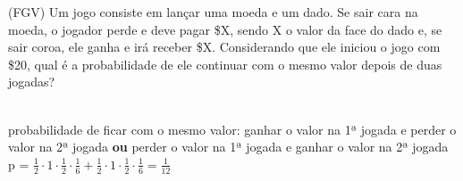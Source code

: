 \begin{ex}
(FGV) Um jogo consiste em lançar uma moeda e um dado. Se sair cara na moeda, o jogador perde e deve pagar \$X, sendo X o valor da face do dado e, se sair coroa, ele ganha e irá receber \$X. Considerando que ele iniciou o jogo com \$20, qual é a probabilidade de ele continuar com o mesmo valor depois de duas jogadas?
  \begin{sol}
    \phantom{A}\\
    probabilidade de ficar com o mesmo valor: ganhar o valor na 1ª jogada e perder o valor na 2ª jogada \textbf{ou} perder o valor na 1ª jogada e ganhar o valor na 2ª jogada \\
    p = $\frac{1}{2}\cdot1\cdot\frac{1}{2}\cdot\frac{1}{6}+\frac{1}{2}\cdot1\cdot\frac{1}{2}\cdot\frac{1}{6}=\frac{1}{12}$
  \end{sol}
\end{ex}